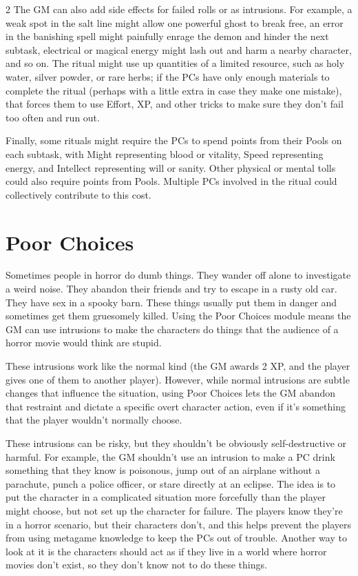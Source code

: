 \begin{multicols}{2}
The GM can also add side effects for failed rolls or as intrusions. For example, a weak spot in the salt line might allow one powerful ghost to break free, an error in the banishing spell might painfully enrage the demon and hinder the next subtask, electrical or magical energy might lash out and harm a nearby character, and so on. The ritual might use up quantities of a limited resource, such as holy water, silver powder, or rare herbs; if the PCs have only enough materials to complete the ritual (perhaps with a little extra in case they make one mistake), that forces them to use Effort, XP, and other tricks to make sure they don’t fail too often and run out.

Finally, some rituals might require the PCs to spend points from their Pools on each subtask, with Might representing blood or vitality, Speed representing energy, and Intellect representing will or sanity. Other physical or mental tolls could also require points from Pools. Multiple PCs involved in the ritual could collectively contribute to this cost.

\section{Poor Choices}

Sometimes people in horror do dumb things. They wander off alone to investigate a weird noise. They abandon their friends and try to escape in a rusty old car. They have sex in a spooky barn. These things usually put them in danger and sometimes get them gruesomely killed. Using the Poor Choices module means the GM can use intrusions to make the characters do things that the audience of a horror movie would think are stupid.

These intrusions work like the normal kind (the GM awards 2 XP, and the player gives one of them to another player). However, while normal intrusions are subtle changes that influence the situation, using Poor Choices lets the GM abandon that restraint and dictate a specific overt character action, even if it’s something that the player wouldn’t normally choose.

These intrusions can be risky, but they shouldn’t be obviously self-destructive or harmful. For example, the GM shouldn’t use an intrusion to make a PC drink something that they know is poisonous, jump out of an airplane without a parachute, punch a police officer, or stare directly at an eclipse. The idea is to put the character in a complicated situation more forcefully than the player might choose, but not set up the character for failure. The players know they’re in a horror scenario, but their characters don’t, and this helps prevent the players from using metagame knowledge to keep the PCs out of trouble. Another way to look at it is the characters should act as if they live in a world where horror movies don’t exist, so they don’t know not to do these things.


\end{multicols}
